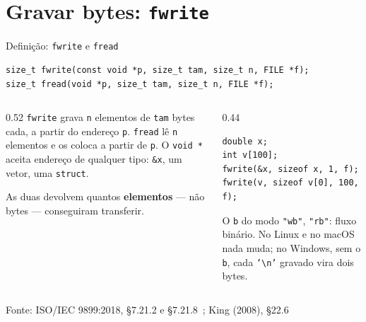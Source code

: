 \documentclass[aspectratio=169]{beamer}
\newcommand{\fonte}[1]{\vfill\hfill{\scriptsize\textcolor{UFSGray}{Fonte: #1}}}
\begin{document}
\section{Gravar bytes: \texttt{fwrite}}

\begin{frame}[fragile]{Definição: \texttt{fwrite} e \texttt{fread}}
  \vspace{-0.3em}
\begin{lstlisting}[style=codC]
size_t fwrite(const void *p, size_t tam, size_t n, FILE *f);
size_t fread(void *p, size_t tam, size_t n, FILE *f);
\end{lstlisting}
  \begin{columns}[T]
    \begin{column}{0.52\textwidth}
      \small \texttt{fwrite} grava \texttt{n} elementos de \texttt{tam} bytes
      cada, a partir do endereço \texttt{p}. \texttt{fread} lê \texttt{n}
      elementos e os coloca a partir de \texttt{p}. O \texttt{void *} aceita
      endereço de qualquer tipo: \texttt{\&x}, um vetor, uma
      \texttt{struct}.

      \medskip
      As duas devolvem quantos \textbf{elementos} --- não bytes ---
      conseguiram transferir.
    \end{column}
    \begin{column}{0.44\textwidth}
\begin{lstlisting}[style=codC]
double x;
int v[100];
fwrite(&x, sizeof x, 1, f);
fwrite(v, sizeof v[0], 100, f);
\end{lstlisting}
      \begin{block}{O \texttt{b} do modo}
        \small \texttt{"wb"}, \texttt{"rb"}: fluxo binário. No Linux e no
        macOS nada muda; no Windows, sem o \texttt{b}, cada
        \texttt{'\textbackslash n'} gravado vira dois bytes.
      \end{block}
    \end{column}
  \end{columns}
  \fonte{ISO/IEC 9899:2018, §7.21.2 e §7.21.8~\cite{iso2018c17};
    King (2008), §22.6~\cite{king2008c}}
\end{frame}
\end{document}
